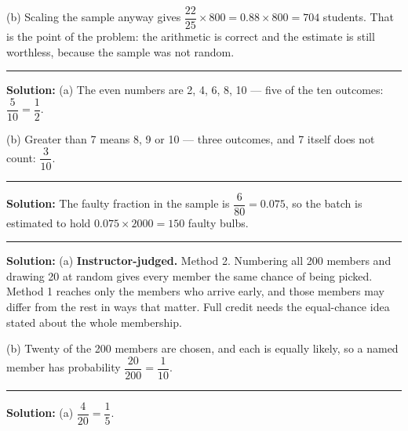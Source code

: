 \documentclass[12pt]{article}
\begin{document}
(b) Scaling the sample anyway gives
$\dfrac{22}{25} \times 800 = 0.88 \times 800 = 704$ students. That is the point
of the problem: the arithmetic is correct and the estimate is still worthless,
because the sample was not random. 

\vspace{0.25cm}\noindent\rule{\linewidth}{0.2pt}\vspace{0.25cm}


\textbf{Solution:} (a) The even numbers are 2, 4, 6, 8, 10 --- five of the ten
outcomes: $\dfrac{5}{10} = \dfrac{1}{2}$. 

(b) Greater than 7 means 8, 9 or 10 --- three outcomes, and 7 itself does not
count: $\dfrac{3}{10}$. 

\vspace{0.25cm}\noindent\rule{\linewidth}{0.2pt}\vspace{0.25cm}


\textbf{Solution:} The faulty fraction in the sample is
$\dfrac{6}{80} = 0.075$, so the batch is estimated to hold
$0.075 \times 2000 = 150$ faulty bulbs. 

\vspace{0.25cm}\noindent\rule{\linewidth}{0.2pt}\vspace{0.25cm}


\textbf{Solution:} (a) \textbf{Instructor-judged.} Method 2. Numbering all 200
members and drawing 20 at random gives every member the same chance of being
picked. Method 1 reaches only the members who arrive early, and those members
may differ from the rest in ways that matter. Full credit needs the equal-chance
idea stated about the whole membership.

(b) Twenty of the 200 members are chosen, and each is equally likely, so a named
member has probability $\dfrac{20}{200} = \dfrac{1}{10}$. 

\vspace{0.25cm}\noindent\rule{\linewidth}{0.2pt}\vspace{0.25cm}


\textbf{Solution:} (a) $\dfrac{4}{20} = \dfrac{1}{5}$. 
\end{document}
